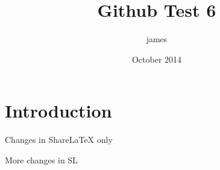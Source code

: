 \documentclass{article}
\title{Github Test 6}
\author{james }
\date{October 2014}
\begin{document}
\maketitle

\section{Introduction}

Changes in ShareLaTeX only

More changes in SL
\end{document}

